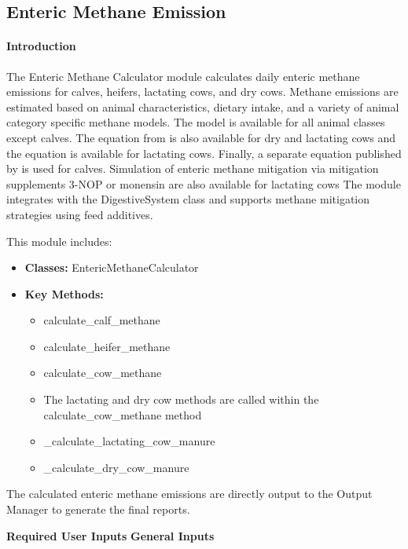 \documentclass{article}
\begin{document}
\begin{refsection}
\subsection{Enteric Methane Emission}
 
    \paragraph{Introduction}
    The Enteric Methane Calculator module calculates daily enteric methane emissions for calves, heifers, lactating cows, and dry cows. Methane emissions are estimated based on animal characteristics, dietary intake, and a variety of animal category specific methane models. The \cite{IPCC2006} model is available for all animal classes except calves. The equation from \cite{Mills2003} is also available for dry and lactating cows and the \cite{Niu2018} equation is available for lactating cows. Finally, a separate equation published by \cite{Pattanaik2003} is used for calves. Simulation of enteric methane mitigation via mitigation supplements 3-NOP or monensin are also available for lactating cows The module integrates with the DigestiveSystem class and supports methane mitigation strategies using feed additives.
    
    This module includes:

    \begin{itemize}
        \item \textbf{Classes:} EntericMethaneCalculator
        \item \textbf{Key Methods:}
        \begin{itemize}
            \item calculate\_calf\_methane
            \item calculate\_heifer\_methane
            \item calculate\_cow\_methane
            \item The lactating and dry cow methods are called within the calculate\_cow\_methane method
            \item \_calculate\_lactating\_cow\_manure
            \item \_calculate\_dry\_cow\_manure
        \end{itemize}

    \end{itemize}

The calculated enteric methane emissions are directly output to the Output Manager to generate the final reports. 

\textbf{Required User Inputs}
\textbf{General Inputs}


\end{refsection}
\end{document}
